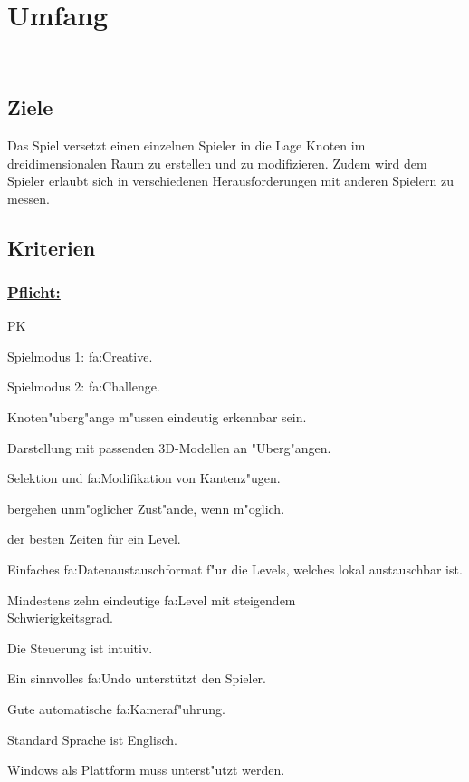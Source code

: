 %
%


\chapter{Umfang}
\label{UF}~\\


%
%
\section{Ziele}
\label{UF:Ziele}

Das Spiel versetzt einen einzelnen Spieler in die Lage Knoten im dreidimensionalen Raum zu erstellen und zu modifizieren. Zudem wird dem Spieler erlaubt sich in verschiedenen Herausforderungen mit anderen Spielern zu messen.\\


\section{Kriterien}
% 
%
\subsection*{\underline{Pflicht:}}

\vspace{1em}

\begin{ids}{\gls{PK}}

	\id[10] Spielmodus 1: \gls{fa:Creative}.
		
	\id[20] Spielmodus 2: \gls{fa:Challenge}.
		
	\id[30] Knoten{"u}berg{"a}nge m{"u}ssen eindeutig erkennbar sein.
		
	\id[40] Darstellung mit passenden 3D-Modellen an {"U}berg{"a}ngen.
		
	\id[50] Selektion und \gls{fa:Modifikation} von Kantenz{"u}gen.
		
	bergehen unm{"o}glicher Zust{"a}nde, wenn m{"o}glich.
		
	 der besten Zeiten für ein Level.
		
	\id[80] Einfaches \gls{fa:Datenaustauschformat} f{"u}r die Levels, welches lokal austauschbar ist.
		
	\id[80] Mindestens zehn eindeutige \gls{fa:Level} mit steigendem \\Schwierigkeitsgrad.
		
	\id[90] Die Steuerung ist intuitiv.
		
	\id[100] Ein sinnvolles \gls{fa:Undo} unterstützt den Spieler.
		
	\id[110] Gute automatische \gls{fa:Kamera}f{"u}hrung.
		
	\id[120] Standard Sprache ist Englisch.	
		
	\id[130] Windows als Plattform muss unterst{"u}tzt werden.

\end{ids}


